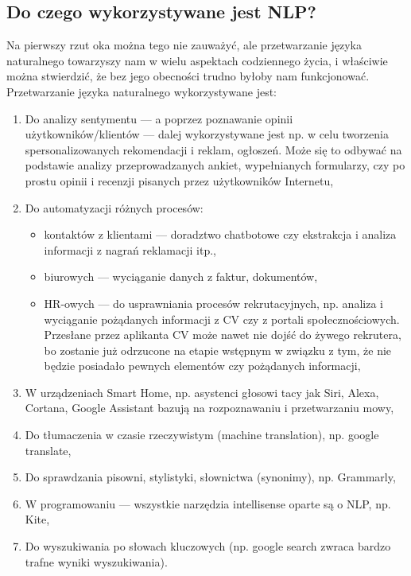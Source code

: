 \subsection{Do czego wykorzystywane jest NLP?
}
Na pierwszy rzut oka można tego nie zauważyć, ale przetwarzanie języka naturalnego towarzyszy nam w wielu aspektach codziennego życia, i właściwie można stwierdzić, że bez jego obecności trudno byłoby nam funkcjonować.
\\

\noindent Przetwarzanie języka naturalnego wykorzystywane jest:
\begin{enumerate}
\item Do analizy sentymentu --- a poprzez poznawanie opinii użytkowników/klientów --- dalej wykorzystywane jest np. w celu tworzenia spersonalizowanych rekomendacji i reklam, ogłoszeń. Może się to odbywać na podstawie analizy przeprowadzanych ankiet, wypełnianych formularzy, czy po prostu opinii i recenzji pisanych przez użytkowników Internetu,
\item Do automatyzacji różnych procesów:
	\begin{itemize}
	\item kontaktów z klientami --- doradztwo chatbotowe czy ekstrakcja i analiza informacji z nagrań reklamacji itp.,
	\item biurowych --- wyciąganie danych z faktur, dokumentów,
	\item HR-owych ---  do usprawniania procesów rekrutacyjnych, np. analiza i wyciąganie pożądanych informacji z CV czy z portali społecznościowych. Przesłane przez aplikanta CV może nawet nie dojść do żywego rekrutera, bo zostanie już odrzucone na etapie wstępnym w związku z tym, że nie będzie posiadało pewnych elementów czy pożądanych informacji,
	\end{itemize}
\item W urządzeniach Smart Home, np. asystenci głosowi tacy jak Siri, Alexa, Cortana, Google Assistant bazują na rozpoznawaniu i przetwarzaniu mowy, 
\item Do tłumaczenia w czasie rzeczywistym (machine translation), np. google translate,
\item Do sprawdzania pisowni, stylistyki, słownictwa (synonimy), np. Grammarly,
\item W programowaniu --- wszystkie narzędzia intellisense oparte są o NLP, np. Kite,
\item Do wyszukiwania po słowach kluczowych (np. google search zwraca bardzo trafne wyniki wyszukiwania).
\end{enumerate}

